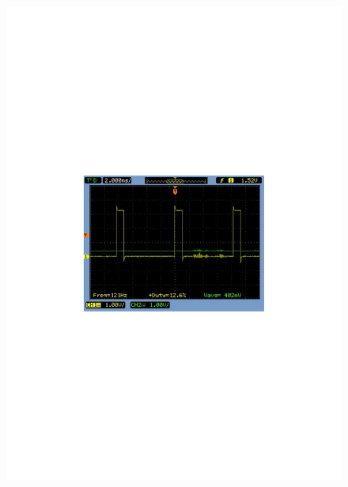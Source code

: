 \begin{figure}[H] \centering
\begin{minipage}[b]{0.48\textwidth} \centering
\includegraphics[width=1.00\textwidth]{filer/modultest/Billeder/SCOP_humidVARM} %
\end{minipage} \hfill
\begin{minipage}[b]{0.48\textwidth} \centering

\end{minipage}
\end{figure}
